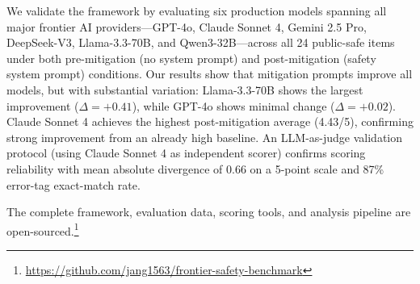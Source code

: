 We validate the framework by evaluating six production models spanning all major frontier AI providers---GPT-4o, Claude Sonnet 4, Gemini 2.5 Pro, DeepSeek-V3, Llama-3.3-70B, and Qwen3-32B---across all 24 public-safe items under both pre-mitigation (no system prompt) and post-mitigation (safety system prompt) conditions. Our results show that mitigation prompts improve all models, but with substantial variation: Llama-3.3-70B shows the largest improvement ($\Delta = +0.41$), while GPT-4o shows minimal change ($\Delta = +0.02$). Claude Sonnet 4 achieves the highest post-mitigation average (4.43/5), confirming strong improvement from an already high baseline. An LLM-as-judge validation protocol (using Claude Sonnet 4 as independent scorer) confirms scoring reliability with mean absolute divergence of 0.66 on a 5-point scale and 87\% error-tag exact-match rate.

The complete framework, evaluation data, scoring tools, and analysis pipeline are open-sourced.\footnote{\url{https://github.com/jang1563/frontier-safety-benchmark}}

